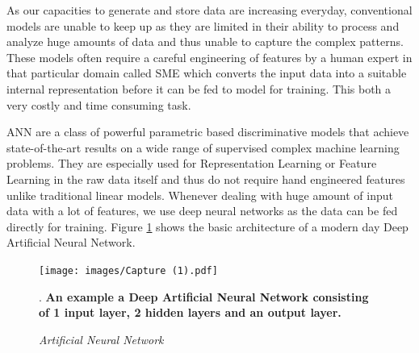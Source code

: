 \documentclass[12pt,a4paper]{article}
\begin{document}
As our capacities to generate and store data are increasing everyday, conventional models are unable to keep up as they are limited in their ability to process and analyze huge amounts of data and thus unable to capture the complex patterns. These models often require a careful engineering of features by a human expert in that particular domain called SME which converts the input data into a suitable internal representation before it can be fed to model for training. This both a very costly and time consuming task.
\vspace{2mm}

ANN are a class of powerful parametric based discriminative models that achieve state-of-the-art results on a wide range of supervised complex machine learning problems. They are especially used for Representation Learning or Feature Learning in the raw data itself and thus do not require hand engineered features unlike traditional linear models. Whenever dealing with huge amount of input data with a lot of features, we use deep neural networks as the data can be fed directly for training. Figure \ref{fig:01} shows the basic architecture of a modern day Deep Artificial Neural Network. 
\vspace{2mm}

\begin{figure}[!b]
\vspace{-5mm}
\begin{center}
\texttt{[image: images/Capture (1).pdf]}
\end{center}
\caption{\textit{Artificial Neural Network}} \cite{Hu:2019}. \textbf{An example a Deep Artificial Neural Network consisting of 1 input layer, 2 hidden layers and an output layer.}
\label{fig:01}
\vspace{-3mm}
\end{figure}
\end{document}
